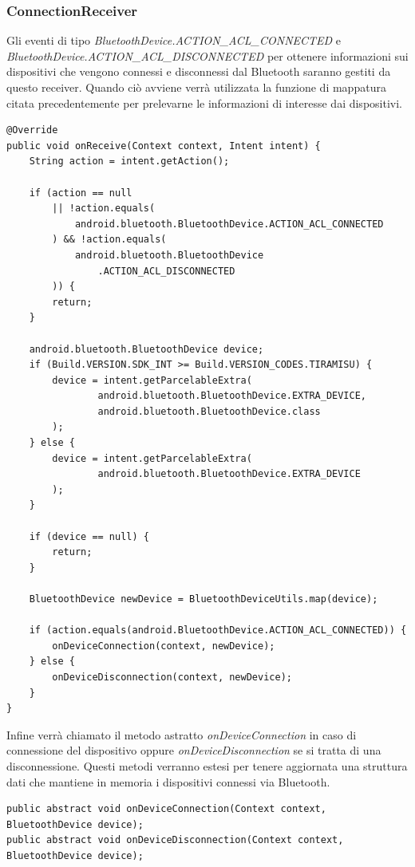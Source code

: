 \subsubsection{ConnectionReceiver}
Gli eventi di tipo \textit{BluetoothDevice.ACTION\_ACL\_CONNECTED} e \textit{BluetoothDevice.ACTION\_ACL\_DISCONNECTED} per ottenere informazioni sui dispositivi che vengono connessi e disconnessi dal Bluetooth saranno gestiti da questo receiver. Quando ciò avviene verrà utilizzata la funzione di mappatura citata precedentemente per prelevarne le informazioni di interesse dai dispositivi.
\begin{verbatim}
@Override
public void onReceive(Context context, Intent intent) {
    String action = intent.getAction();

    if (action == null 
        || !action.equals(
            android.bluetooth.BluetoothDevice.ACTION_ACL_CONNECTED
        ) && !action.equals(
            android.bluetooth.BluetoothDevice
                .ACTION_ACL_DISCONNECTED
        )) {
        return;
    }

    android.bluetooth.BluetoothDevice device;
    if (Build.VERSION.SDK_INT >= Build.VERSION_CODES.TIRAMISU) {
        device = intent.getParcelableExtra(
                android.bluetooth.BluetoothDevice.EXTRA_DEVICE,
                android.bluetooth.BluetoothDevice.class
        );
    } else {
        device = intent.getParcelableExtra(
                android.bluetooth.BluetoothDevice.EXTRA_DEVICE
        );
    }

    if (device == null) {
        return;
    }

    BluetoothDevice newDevice = BluetoothDeviceUtils.map(device);

    if (action.equals(android.BluetoothDevice.ACTION_ACL_CONNECTED)) {
        onDeviceConnection(context, newDevice);
    } else {
        onDeviceDisconnection(context, newDevice);
    }
}
\end{verbatim}

Infine verrà chiamato il metodo astratto \textit{onDeviceConnection} in caso di connessione del dispositivo oppure \textit{onDeviceDisconnection} se si tratta di una disconnessione. Questi metodi verranno estesi per tenere aggiornata una struttura dati che mantiene in memoria i dispositivi connessi via Bluetooth.
\begin{verbatim}
public abstract void onDeviceConnection(Context context, BluetoothDevice device);
public abstract void onDeviceDisconnection(Context context, BluetoothDevice device);
\end{verbatim}

